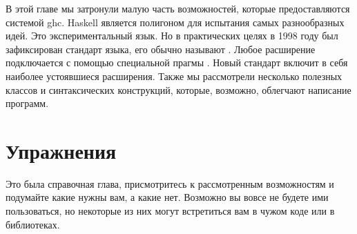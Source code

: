 В этой главе мы затронули малую часть возможностей, которые
предоставляются системой ghc. Haskell является полигоном для испытания
самых разнообразных идей. Это экспериментальный язык. Но в практических
целях в 1998 году был зафиксирован стандарт языка, его обычно называют
. Любое расширение подключается с помощью специальной
прагмы . Новый стандарт  включит в себя
наиболее устоявшиеся расширения. Также мы рассмотрели несколько полезных
классов и синтаксических конструкций, которые, возможно, облегчают
написание программ.

\section{Упражнения}

Это была справочная глава, присмотритесь к рассмотренным возможностям и
подумайте какие нужны вам, а какие нет. Возможно вы вовсе не будете ими
пользоваться, но некоторые из них могут встретиться вам в чужом коде или
в библиотеках.
